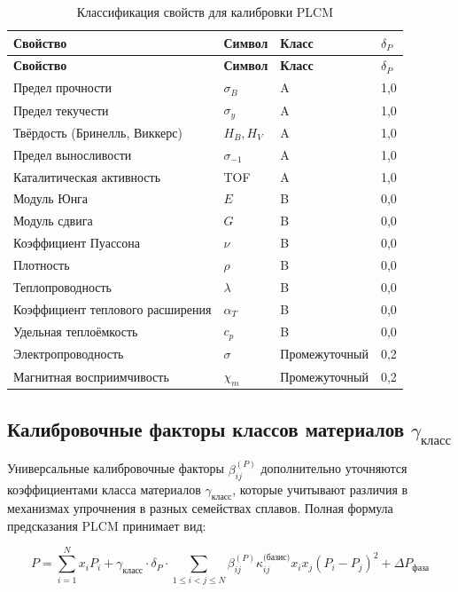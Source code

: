 \documentclass[12pt,a4paper]{article}
\begin{document}
	\begin{longtable}{p{4cm}p{3cm}p{3cm}p{3cm}}
		\caption{Классификация свойств для калибровки PLCM} \label{tab:property-classification} \\
		\toprule
		\textbf{Свойство} & \textbf{Символ} & \textbf{Класс} & \(\delta_P\) \\
		\midrule
		\endfirsthead
		\toprule
		\textbf{Свойство} & \textbf{Символ} & \textbf{Класс} & \(\delta_P\) \\
		\midrule
		\endhead
		Предел прочности & \(\sigma_B\) & A & 1,0 \\
		Предел текучести & \(\sigma_y\) & A & 1,0 \\
		Твёрдость (Бринелль, Виккерс) & \(H_B, H_V\) & A & 1,0 \\
		Предел выносливости & \(\sigma_{-1}\) & A & 1,0 \\
		Каталитическая активность & TOF & A & 1,0 \\
		\hline
		Модуль Юнга & \(E\) & B & 0,0 \\
		Модуль сдвига & \(G\) & B & 0,0 \\
		Коэффициент Пуассона & \(\nu\) & B & 0,0 \\
		Плотность & \(\rho\) & B & 0,0 \\
		Теплопроводность & \(\lambda\) & B & 0,0 \\
		Коэффициент теплового расширения & \(\alpha_T\) & B & 0,0 \\
		Удельная теплоёмкость & \(c_p\) & B & 0,0 \\
		\hline
		Электропроводность & \(\sigma\) & Промежуточный & 0,2 \\
		Магнитная восприимчивость & \(\chi_m\) & Промежуточный & 0,2 \\
		\bottomrule
	\end{longtable}
	
	\subsection{Калибровочные факторы классов материалов \(\gamma_{\text{класс}}\)}
	\label{subsec:material-class-factors}
	
	Универсальные калибровочные факторы \(\beta_{ij}^{(P)}\) дополнительно уточняются коэффициентами класса материалов \(\gamma_{\text{класс}}\), которые учитывают различия в механизмах упрочнения в разных семействах сплавов. Полная формула предсказания PLCM принимает вид:
	
	\begin{equation}
		\boxed{P = \sum_{i=1}^{N} x_i P_i + \gamma_{\text{класс}} \cdot \delta_P \cdot \sum_{1\le i<j\le N} \beta_{ij}^{(P)} \kappa_{ij}^{\text{(базис)}} x_i x_j (P_i - P_j)^2 + \Delta P_{\text{фаза}}}
		\label{eq:plcm-full-calibration}
	\end{equation}
	
\end{document}
